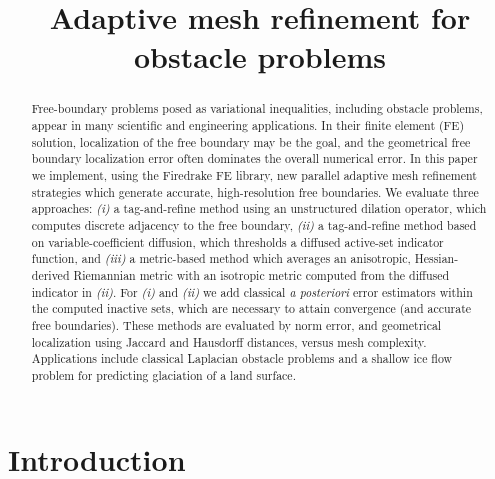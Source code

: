 \documentclass[]{interact}
\theoremstyle{plain}%
\theoremstyle{definition}
\theoremstyle{remark}
\begin{document}

\title{Adaptive mesh refinement for obstacle problems}

\author{
}

\maketitle

\begin{abstract}
Free-boundary problems posed as variational inequalities, including obstacle problems, appear in many scientific and engineering applications.  In their finite element (FE) solution, localization of the free boundary may be the goal, and the geometrical free boundary localization error often dominates the overall numerical error.  In this paper we implement, using the Firedrake FE library, new parallel adaptive mesh refinement strategies which generate accurate, high-resolution free boundaries.  We evaluate three approaches: \emph{(i)} a tag-and-refine method using an unstructured dilation operator, which computes discrete adjacency to the free boundary, \emph{(ii)} a tag-and-refine method based on variable-coefficient diffusion, which thresholds a diffused active-set indicator function, and \emph{(iii)} a metric-based method which averages an anisotropic, Hessian-derived Riemannian metric with an isotropic metric computed from the diffused indicator in \emph{(ii)}.  For \emph{(i)} and \emph{(ii)} we add classical \emph{a posteriori} error estimators within the computed inactive sets, which are necessary to attain convergence (and accurate free boundaries).  These methods are evaluated by norm error, and geometrical localization using Jaccard and Hausdorff distances, versus mesh complexity.  Applications include classical Laplacian obstacle problems and a shallow ice flow problem for predicting glaciation of a land surface.
\end{abstract}



\section{Introduction} \label{sec:intro}
\end{document}
